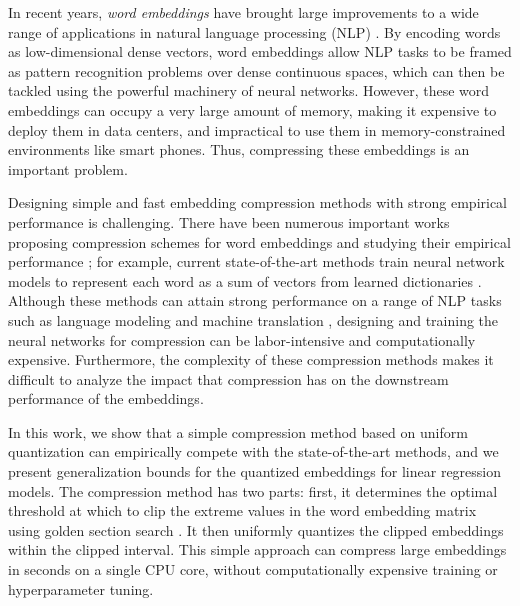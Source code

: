 In recent years, \textit{word embeddings} \citep{word2vec13,glove14,fasttext18} have brought large improvements to a wide range of applications in natural language processing (NLP) \citep{collins16,drqa17}.
By encoding words as low-dimensional dense vectors, word embeddings allow NLP tasks to be framed as pattern recognition problems over dense continuous spaces, which can then be tackled using the powerful machinery of neural networks.
However, these word embeddings can occupy a very large amount of memory, making it expensive to deploy them in data centers, and impractical to use them in memory-constrained environments like smart phones.
Thus, compressing these embeddings is an important problem.

Designing simple and fast embedding compression methods with strong empirical performance is challenging.
There have been numerous important works proposing compression schemes for word embeddings and studying their empirical performance \citep{sparse16,andrews16,dccl17,kway18};
for example, current state-of-the-art methods train neural network models to represent each word as a sum of vectors from learned dictionaries \citep{dccl17,kway18}.
Although these methods can attain strong performance on a range of NLP tasks such as language modeling \citep{mikolov10} and machine translation \citep{bahdanau15}, 
designing and training the neural networks for compression can be labor-intensive and computationally expensive.
Furthermore, the complexity of these compression methods makes it difficult to analyze the impact that compression has on the downstream performance of the embeddings.

In this work, we show that a simple compression method based on uniform quantization can empirically compete with the state-of-the-art methods, and we present generalization bounds for the quantized embeddings for linear regression models.
The compression method has two parts: first, it determines the optimal threshold at which to clip the extreme values in the word embedding matrix using golden section search \citep{golden53}.
It then uniformly quantizes the clipped embeddings within the clipped interval.
This simple approach can compress large embeddings in seconds on a single CPU core, without computationally expensive training or hyperparameter tuning.

